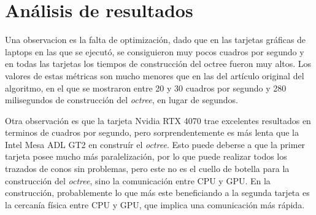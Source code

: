 \section{Análisis de resultados}

Una observacion es la falta de optimización, dado que en las tarjetas gráficas de laptops en las que se ejecutó, se consiguieron muy pocos cuadros por segundo y en todas las tarjetas los tiempos de construcción del octree fueron muy altos.
Los valores de estas métricas son mucho menores que en las del artículo original del algoritmo, en el que se mostraron entre 20 y 30 cuadros por segundo y 280 milisegundos de construcción del \textit{octree}, en lugar de segundos.

Otra observación es que la tarjeta Nvidia RTX 4070 trae excelentes resultados en terminos de cuadros por segundo, pero sorprendentemente es más lenta que la Intel Mesa ADL GT2 en construír el \textit{octree}.
Esto puede deberse a que la primer tarjeta posee mucho más paralelización, por lo que puede realizar todos los trazados de conos sin problemas, pero este no es el cuello de botella para la construcción del \textit{octree}, sino la comunicación entre CPU y GPU.
En la construcción, probablemente lo que más este beneficiando a la segunda tarjeta es la cercanía física entre CPU y GPU, que implica una comunicación más rápida.
